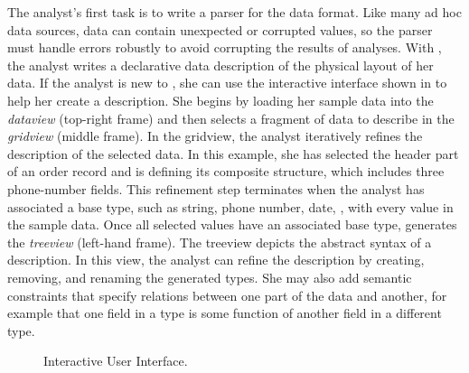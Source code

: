 The analyst's first task is to write a parser for the \dibbler{} data
format.  Like many ad hoc data sources, \dibbler{} data can contain
unexpected or corrupted values, so the parser must handle errors
robustly to avoid corrupting the results of analyses.  With \pads{},
the analyst writes a declarative data description of the physical
layout of her data.    If the analyst is new to \pads{}, she can use the
\launchpads{} interactive interface shown in
 to help her create a \pads{} description.
She begins by loading her sample data into the {\it dataview}
(top-right frame) and then selects a fragment of data to describe in
the {\it gridview} (middle frame).  In the gridview, the analyst
iteratively refines the description of the selected data.  In this
example, she has selected the header part of an order record and
is defining its composite structure, which includes three phone-number fields.
This refinement step terminates when the analyst has associated a base
type, such as string, phone number, date, \etc{}, with every value in
the sample data.  Once all selected values have an associated base
type, \textsc{\launchpads{}} generates the {\it treeview} (left-hand
frame).  The treeview depicts the abstract syntax of a \pads{}
description.  In this view, the analyst can refine the description by
creating, removing, and renaming the generated types.  She may also
add semantic constraints that specify relations between one part of
the data and another, for example that one field in a type is some
function of another field in a different type.
\begin{figure}
  \begin{center}
  \end{center}
  \caption{\launchpads{} Interactive User Interface.}
  \label{figure:launchpads}
\end{figure}

